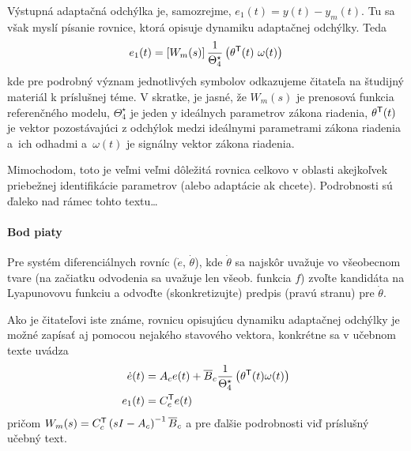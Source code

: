 \documentclass[a4paper, 10pt, ]{article}
\begin{document}
\noindent
Výstupná adaptačná odchýlka je, samozrejme, $e_1(t) = y(t) - y_m(t)$. Tu sa však myslí písanie rovnice, ktorá opisuje dynamiku adaptačnej odchýlky. Teda
\begin{equation} \label{vvMRAC_adaptOdchDefTFt}
	e_1(t) =  \left[ W_m(s)  \right] \frac{1}{\Theta_4^\star} \left( \theta^{\mathsf{T}}(t) \ \omega(t) \right)
\end{equation}
kde pre podrobný význam jednotlivých symbolov odkazujeme čitateľa na študijný materiál k príslušnej téme. V skratke, je jasné, že $W_m(s)$ je prenosová funkcia referenčného modelu, $\Theta_4^\star$ je jeden y ideálnych parametrov zákona riadenia, $\theta^{\mathsf{T}}(t)$ je vektor pozostávajúci z odchýlok medzi ideálnymi parametrami zákona riadenia a~ich odhadmi a~$\omega(t)$ je signálny vektor zákona riadenia.

Mimochodom, toto je veľmi veľmi dôležitá rovnica celkovo v oblasti akejkoľvek priebežnej identifikácie parametrov (alebo adaptácie ak chcete). Podrobnosti sú ďaleko nad rámec tohto textu\ldots














\paragraph{Bod piaty}

\smallskip

{\color{gray}

Pre systém diferenciálnych rovníc ($\dot e$, $\dot \theta$), kde $\dot \theta$ sa najskôr uvažuje vo všeobecnom tvare (na začiatku odvodenia sa uvažuje len všeob. funkcia $f$) zvoľte kandidáta na Lyapunovovu funkciu a odvoďte (skonkretizujte) predpis (pravú stranu) pre $\dot \theta$.

}

\smallskip

\noindent
Ako je čitateľovi iste známe, rovnicu opisujúcu dynamiku adaptačnej odchýlky je možné zapísať aj pomocou nejakého stavového vektora, konkrétne sa v učebnom texte uvádza
\begin{subequations} \label{vvMRAC_adaptOdchDefSSt}
	\begin{align}
		\dot e(t) &= A_c e(t) + \overline{B}_c \frac{1}{\Theta_4^\star} \left( \theta^{\mathsf{T}}(t) \omega(t) \right) \\
		e_1(t) &= C_c^{\mathsf{T}} e(t)
	\end{align}
\end{subequations}
pričom $W_m(s) = C_c^{\mathsf{T}} \left( s I - A_c \right)^{-1} \overline{B}_c$ a pre ďalšie podrobnosti viď príslušný učebný text.
\end{document}
